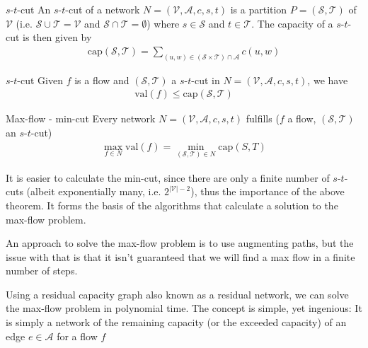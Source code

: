 \begin{definition}[]{$s$-$t$-cut}
    An $s$-$t$-cut of a network $N = (\mathcal{V}, \mathcal{A}, c, s, t)$ is a partition $P = (\mathcal{S}, \mathcal{T})$ of $\mathcal{V}$ (i.e. $\mathcal{S} \cup \mathcal{T} = \mathcal{V}$ and $\mathcal{S} \cap \mathcal{T} = \emptyset$) where $s \in \mathcal{S}$ and $t \in \mathcal{T}$.
    The capacity of a $s$-$t$-cut is then given by
    \begin{align*}
        \text{cap}(\mathcal{S}, \mathcal{T}) = \sum_{(u, w) \in (\mathcal{S} \times \mathcal{T}) \cap \mathcal{A}} c(u, w)
    \end{align*}
\end{definition}

\begin{lemma}[]{$s$-$t$-cut}
    Given $f$ is a flow and $(\mathcal{S}, \mathcal{T})$ a $s$-$t$-cut in $N = (\mathcal{V}, \mathcal{A}, c, s, t)$, we have
    \begin{align*}
        \text{val}(f) \leq \text{cap}(\mathcal{S}, \mathcal{T})
    \end{align*}
\end{lemma}


\begin{theorem}[]{Max-flow - min-cut}
    Every network $N = (\mathcal{V}, \mathcal{A}, c, s, t)$ fulfills ($f$ a flow, $(\mathcal{S}, \mathcal{T})$ an $s$-$t$-cut)
    \begin{align*}
        \max_{f \in N} \text{val}(f) = \min_{(\mathcal{S}, \mathcal{T}) \in N} \text{cap}(S, T)
    \end{align*}
\end{theorem}

It is easier to calculate the min-cut, since there are only a finite number of $s$-$t$-cuts (albeit exponentially many, i.e. $2^{|\mathcal{V}| - 2}$), thus the importance of the above theorem.
It forms the basis of the algorithms that calculate a solution to the max-flow problem.

An approach to solve the max-flow problem is to use augmenting paths, but the issue with that is that it isn't guaranteed that we will find a max flow in a finite number of steps.


Using a residual capacity graph also known as a residual network, we can solve the max-flow problem in polynomial time.
The concept is simple, yet ingenious: It is simply a network of the remaining capacity (or the exceeded capacity) of an edge $e \in \mathcal{A}$ for a flow $f$

